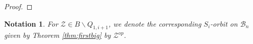 \documentclass[12pt]{amsart}
\numberwithin{equation}{section}
\newtheorem{nota}[thm]{Notation}
\newcommand{\cZ}{{\mathcal Z}}
\newcommand{\C}{\mbox{${\mathbb C}$}}
\newcommand{\B}{\mathcal{B}}
\newcommand{\F}{\mathcal{F}}
\begin{document}
\begin{proof}



\end{proof}
\begin{nota}\label{n:op}
For $\cZ\in B\backslash Q_{1,i+1}$, we denote the corresponding $S_{i}$-orbit on $\B_{n}$ given by Theorem \ref{thm:firstbig} by $\cZ^{op}$.  
\end{nota}
\end{document}

